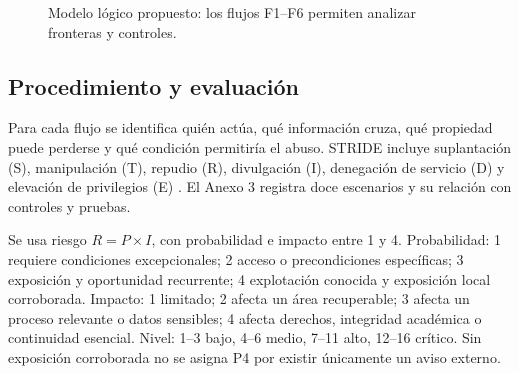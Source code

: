 \documentclass[10pt,a4paper]{article}
\begin{document}
\begin{figure}[H]\centering
{}
\caption{Modelo lógico propuesto: los flujos F1--F6 permiten analizar fronteras y controles.}
\label{fig:dfd}
\end{figure}

\subsection{Procedimiento y evaluación}
Para cada flujo se identifica quién actúa, qué información cruza, qué propiedad puede perderse y qué condición permitiría el abuso. STRIDE incluye suplantación (S), manipulación (T), repudio (R), divulgación (I), denegación de servicio (D) y elevación de privilegios (E) \cite{R06}. El Anexo 3 registra doce escenarios y su relación con controles y pruebas.

Se usa riesgo $R=P\times I$, con probabilidad e impacto entre 1 y 4. Probabilidad: 1 requiere condiciones excepcionales; 2 acceso o precondiciones específicas; 3 exposición y oportunidad recurrente; 4 explotación conocida y exposición local corroborada. Impacto: 1 limitado; 2 afecta un área recuperable; 3 afecta un proceso relevante o datos sensibles; 4 afecta derechos, integridad académica o continuidad esencial. Nivel: 1--3 bajo, 4--6 medio, 7--11 alto, 12--16 crítico. Sin exposición corroborada no se asigna P4 por existir únicamente un aviso externo.
\end{document}
